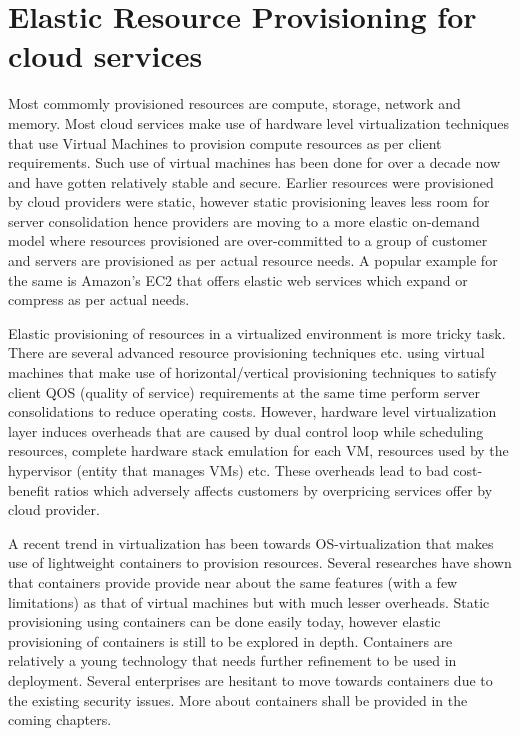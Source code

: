   \section{Elastic Resource Provisioning for cloud services}
  
    Most commomly provisioned resources are compute, storage, network and memory. Most cloud services make use of hardware level 
virtualization techniques that use Virtual Machines to provision compute resources as per client requirements. Such use of virtual machines 
has been done for over a decade now and have gotten relatively stable and secure. Earlier resources were provisioned by cloud providers 
were static, however static provisioning leaves less room for server consolidation hence providers are moving to a more elastic on-demand 
model where resources provisioned are over-committed to a group of customer and servers are provisioned as per actual resource needs. A 
popular example for the same is Amazon's EC2 \cite{amazonec2} that offers elastic web services which expand or compress as per actual 
needs. 

    Elastic provisioning of resources in a virtualized environment is more tricky task. There are several advanced resource provisioning 
techniques \cite{dornemann2009demand} \cite{shen2011cloudscale} \cite{moreno2009elastic} \cite{calheiros2012aneka} etc. using virtual 
machines that make use of horizontal/vertical provisioning techniques to satisfy client QOS (quality of service) requirements at the same 
time perform server consolidations to reduce operating costs. However, hardware level virtualization layer induces overheads that are 
caused by dual control loop while scheduling resources, complete hardware stack emulation for each VM, resources used by the hypervisor 
(entity that manages VMs) etc. These overheads lead to bad cost-benefit ratios which adversely affects customers by overpricing services 
offer by cloud provider.
  
    A recent trend in virtualization has been towards OS-virtualization that makes use of lightweight containers to provision resources. 
Several researches \cite{felter2015updated} \cite{morabito2015hypervisors} \cite{agarwal2015containing} \cite{beserra2015performance} 
\cite{rathore2013kvm} have shown that containers provide provide near about the same features (with a few limitations) as that of virtual 
machines but with much lesser overheads. Static provisioning using containers can be done easily today, however elastic provisioning of 
containers is still to be explored in depth. Containers are relatively a young technology that needs further refinement to be used in 
deployment. Several enterprises are hesitant to move towards containers due to the existing security issues. More about containers shall be 
provided in the coming chapters.

